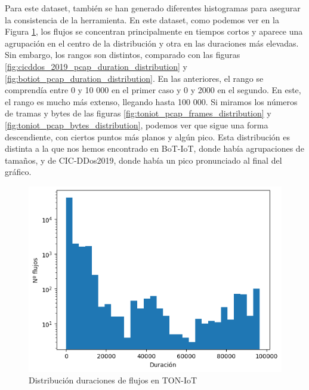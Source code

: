 
Para este dataset, también se han generado diferentes histogramas para asegurar la consistencia de la herramienta. En este dataset, como podemos ver en la Figura \ref{fig:toniot_pcap_duration_distribution}, los flujos se concentran principalmente en tiempos cortos y aparece una agrupación en el centro de la distribución y otra en las duraciones más elevadas. Sin embargo, los rangos son distintos, comparado con las figuras \ref{fig:cicddos_2019_pcap_duration_distribution} y \ref{fig:botiot_pcap_duration_distribution}. En las anteriores, el rango se comprendía entre 0 y 10 000 en el primer caso y 0 y 2000 en el segundo. En este, el rango es mucho más extenso, llegando hasta 100 000. Si miramos los números de tramas y bytes de las figuras \ref{fig:toniot_pcap_frames_distribution} y \ref{fig:toniot_pcap_bytes_distribution}, podemos ver que sigue una forma descendiente, con ciertos puntos más planos y algún pico. Esta distribución es distinta a la que nos hemos encontrado en BoT-IoT, donde había agrupaciones de tamaños, y de CIC-DDos2019, donde había un pico pronunciado al final del gráfico.

\begin{figure}[H]
  \begin{center}
      \includegraphics[width=0.49\linewidth]{media/toniot_pcap_duration_distribution.png}
  \end{center}
  \captionsetup{justification=centering}
  \caption{Distribución duraciones de flujos en TON-IoT}\label{fig:toniot_pcap_duration_distribution}
\end{figure}

